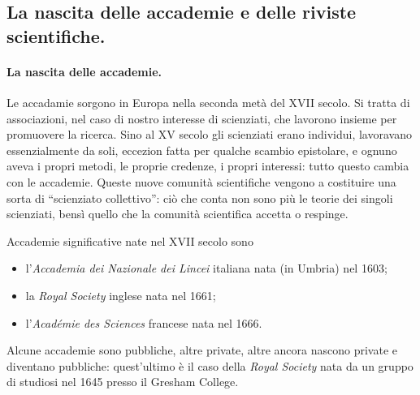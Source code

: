 \subsection{La nascita delle accademie e delle riviste scientifiche.}\label{LaNascitaDelleAccademieEDelleRivisteScientifiche}
\paragraph{La nascita delle accademie.} Le accadamie sorgono in Europa nella seconda met\`a del XVII secolo. Si tratta di associazioni, nel caso di nostro interesse di scienziati, che lavorono insieme per promuovere la ricerca. Sino al XV secolo gli scienziati erano individui, lavoravano essenzialmente da soli, eccezion fatta per qualche scambio epistolare, e ognuno aveva i propri metodi, le proprie credenze, i propri interessi: tutto questo cambia con le accademie. Queste nuove comunit\`a scientifiche vengono a costituire una sorta di ``scienziato collettivo'': ci\`o che conta non sono pi\`u le teorie dei singoli scienziati, bens\`i quello che la comunit\`a scientifica accetta o respinge.
\par Accademie significative nate nel XVII secolo sono
\begin{itemize}
	\item l'\textit{Accademia dei Nazionale dei Lincei} italiana nata (in Umbria) nel 1603;
	\item la \textit{Royal Society} inglese nata nel 1661;
	\item l'\textit{Acad\'emie des Sciences} francese nata nel 1666.
\end{itemize}
\par Alcune accademie sono pubbliche, altre private, altre ancora nascono private e diventano pubbliche: quest'ultimo \`e il caso della \textit{Royal Society} nata da un gruppo di studiosi nel 1645 presso il Gresham College.
